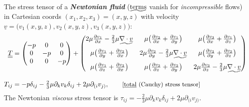 \documentclass[12pt,landscape]{article}
\begin{document}
\noindent
The stress tensor of a \textbf{\emph{Newtonian fluid}} ($\undertilde{\text{terms}}$ vanish for \emph{incompressible} flows) in Cartesian coords $(x_1,x_2,x_3)=(x,y,z)$ with velocity $\underline{v} = \big(v_1(x,y,z),v_2(x,y,z),v_3(x,y,z)\big)$:
\begin{align}
    \hspace{-5mm}
    \underline{\underline{T}}
    &=
    \begin{pmatrix}
    -p & 0 & 0\\
    0 & -p & 0\\
    0 & 0 & -p
    \end{pmatrix} +
    \begin{pmatrix}
    2\mu \frac{\partial v_1}{\partial x} - \frac{2}{3}\mu\undertilde{\nabla\cdot\underline{v}} & \mu\big(\frac{\partial v_2}{\partial x} + \frac{\partial v_1}{\partial y}\big) & \mu\big(\frac{\partial v_3}{\partial x} + \frac{\partial v_1}{\partial z}\big)\\[3mm]
    \mu\big(\frac{\partial v_1}{\partial y} + \frac{\partial v_2}{\partial x}\big) & 2\mu \frac{\partial v_2}{\partial y} - \frac{2}{3}\mu\undertilde{\nabla\cdot\underline{v}} & \mu\big(\frac{\partial v_3}{\partial y} + \frac{\partial v_2}{\partial z}\big)\\[3mm]
    \mu\big(\frac{\partial v_1}{\partial z} + \frac{\partial v_3}{\partial x}\big) & \mu\big(\frac{\partial v_2}{\partial z} + \frac{\partial v_3}{\partial y}\big)  & 2\mu \frac{\partial v_3}{\partial z} - \frac{2}{3}\mu\undertilde{\nabla\cdot\underline{v}}
    \end{pmatrix}
    \nonumber\\[3mm]
    T_{ij} &= -p\delta_{ij} - \tfrac{2}{3}\mu \partial_k v_k \delta_{ij} + 2\mu\partial_{(i}v_{j)}, \tag*{\text{\small[\underline{total} (Cauchy) stress tensor]}}
\end{align}
The Newtonian \emph{viscous} stress tensor is $\tau_{ij} = - \tfrac{2}{3}\mu \partial_k v_k \delta_{ij} + 2\mu\partial_{(i}v_{j)}$.
\end{document}
